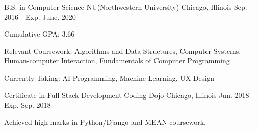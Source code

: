 

\begin{cventries}

  \cventry
    {B.S. in Computer Science} %
    {NU(Northwestern University)} %
    {Chicago, Illinois} %
    {Sep. 2016 - Exp. June. 2020} %
    {
      \begin{cvitems} %
        \item {Cumulative GPA: 3.66}
        \item {Relevant Coursework: Algorithms and Data Structures, Computer Systems, Human-computer Interaction, Fundamentals of Computer Programming}
        \item {Currently Taking: AI Programming, Machine Learning, UX Design}
      \end{cvitems}
    }

  \cventry
    {Certificate in Full Stack Development} %
    {Coding Dojo} %
    {Chicago, Illinois} %
    {Jun. 2018 - Exp. Sep. 2018} %
    {
      \begin{cvitems} %
        \item Achieved high marks in Python/Django and MEAN coursework.
      \end{cvitems}
    }

\end{cventries}
